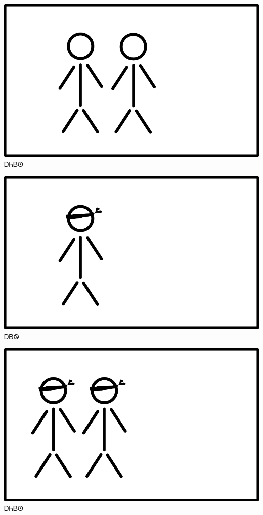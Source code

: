 \documentclass[avery5371]{flashcards}%
\begin{document}

\begin{flashcard}{
\includegraphics[width=0.95\columnwidth,height=.51\columnwidth,keepaspectratio]{../artwork/flags/aniyvwi-no-flag}
}\Huge ᎠᏂᏴᏫ
\end{flashcard}


\begin{flashcard}{
\includegraphics[width=0.95\columnwidth,height=.51\columnwidth,keepaspectratio]{../artwork/flags/ayvwi-no-flag-blind}
}\Huge ᎠᏴᏫ
\end{flashcard}


\begin{flashcard}{
\includegraphics[width=0.95\columnwidth,height=.51\columnwidth,keepaspectratio]{../artwork/flags/aniyvwi-no-flag-blind}
}\Huge ᎠᏂᏴᏫ
\end{flashcard}
\end{document}
